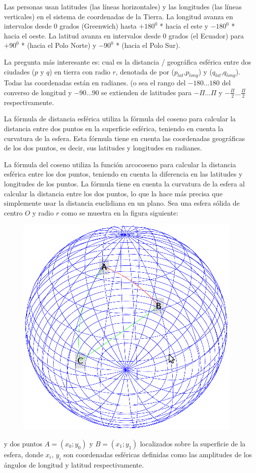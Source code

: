 Las personas usan latitudes (las líneas horizontales) y las longitudes (las líneas verticales) en el sistema de coordenadas de la Tierra. La longitud avanza en intervalos desde $0$ grados (Greenwich) hasta $+180^0$ * hacia el este y $-180^0$ * hacia el oeste. La latitud avanza en intervalos desde 0 grados (el Ecuador) para $+90^0$ * (hacia el Polo Norte) y $-90^0$ * (hacia el Polo Sur). 

La pregunta más interesante es: cual es la distancia / geográfica esférica entre  dos ciudades ($p$ y $q$) en tierra con radio $r$, denotada de por ($p_{lat}$,$p_{long}$) y ($q_{lat}$,$q_{long}$). Todas las coordenadas están en radianes. (o sea el rango del $-180 \dots 180$ del converso de longitud y $-90 \dots 90$ se extienden de latitudes para $-\Pi  \dots \Pi$ y $-\frac{\Pi}{2}  \dots \frac{\Pi}{2}$ respectivamente.

La fórmula de distancia esférica utiliza la fórmula del coseno para calcular la distancia entre dos puntos en la superficie esférica, teniendo en cuenta la curvatura de la esfera. Esta fórmula tiene en cuenta las coordenadas geográficas de los dos puntos, es decir, sus latitudes y longitudes en radianes.

La fórmula del coseno utiliza la función arcocoseno para calcular la distancia esférica entre los dos puntos, teniendo en cuenta la diferencia en las latitudes y longitudes de los puntos. La fórmula tiene en cuenta la curvatura de la esfera al calcular la distancia entre los dos puntos, lo que la hace más precisa que simplemente usar la distancia euclidiana en un plano. Sea una esfera sólida de centro $O$ y radio $r$ como se muestra en la figura siguiente: 

\begin{figure}[h!]
	\centering
	\includegraphics[width=0.3\linewidth]{img/esfera}
	\label{fig:esfera}
\end{figure}

y dos puntos $A=(x_0;y_0)$ y $B=(x_1;y_1)$ localizados sobre la superficie de la esfera, donde $x_i$, $y_i$ son coordenadas esféricas definidas como las amplitudes de los ángulos de longitud y latitud respectivamente. 

